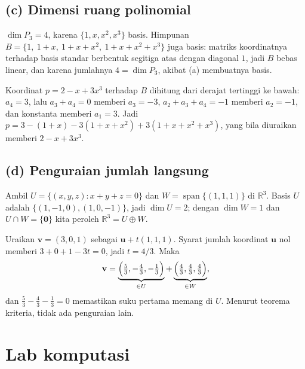 \subsection*{(c) Dimensi ruang polinomial}

$\dim P_{3}=4$, karena $\{1,x,x^{2},x^{3}\}$ basis. Himpunan
$B=\{1,\ 1+x,\ 1+x+x^{2},\ 1+x+x^{2}+x^{3}\}$ juga basis: matriks koordinatnya terhadap
basis standar berbentuk segitiga atas dengan diagonal $1$, jadi $B$ bebas linear, dan karena
jumlahnya $4=\dim P_{3}$, akibat (a) membuatnya basis.

Koordinat $p=2-x+3x^{3}$ terhadap $B$ dihitung dari derajat tertinggi ke bawah: $a_{4}=3$,
lalu $a_{3}+a_{4}=0$ memberi $a_{3}=-3$, $a_{2}+a_{3}+a_{4}=-1$ memberi $a_{2}=-1$, dan
konstanta memberi $a_{1}=3$. Jadi $p=3-(1+x)-3(1+x+x^{2})+3(1+x+x^{2}+x^{3})$, yang bila
diuraikan memberi $2-x+3x^{3}$.

\subsection*{(d) Penguraian jumlah langsung}

Ambil $U=\{(x,y,z):x+y+z=0\}$ dan $W=\operatorname{span}\{(1,1,1)\}$ di $\mathbb{R}^{3}$.
Basis $U$ adalah $\{(1,-1,0),(1,0,-1)\}$, jadi $\dim U=2$; dengan $\dim W=1$ dan
$U\cap W=\{\mathbf{0}\}$ kita peroleh $\mathbb{R}^{3}=U\oplus W$.

Uraikan $\mathbf{v}=(3,0,1)$ sebagai $\mathbf{u}+t(1,1,1)$. Syarat jumlah koordinat
$\mathbf{u}$ nol memberi $3+0+1-3t=0$, jadi $t=4/3$. Maka
\[
  \mathbf{v}=\underbrace{\Bigl(\tfrac53,-\tfrac43,-\tfrac13\Bigr)}_{\in U}
  +\underbrace{\Bigl(\tfrac43,\tfrac43,\tfrac43\Bigr)}_{\in W},
\]
dan $\tfrac53-\tfrac43-\tfrac13=0$ memastikan suku pertama memang di $U$. Menurut teorema
kriteria, tidak ada penguraian lain.


\section{Lab komputasi}

